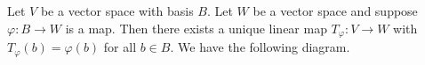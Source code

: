     \begin{proposition}
        Let $V$ be a vector space with basis $B$. Let $W$ be a vector space and suppose $\varphi:B \rightarrow W$ is a map. Then there exists a unique linear map $T_\varphi: V \rightarrow W$ with $T_\varphi(b) = \varphi(b)$ for all $b \in B$. We have the following diagram.
            \begin{center}
            \end{center}
    \end{proposition}

